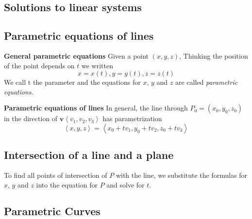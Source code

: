 \documentclass{article}
\newcommand\printvec[1]{\mathbf{#1}}
\newcommand\lrangle[1]{\left \langle #1 \right \rangle}
\begin{document}
\subsection{Solutions to linear systems}

\subsection{Parametric equations of lines}
\textbf{General parametric equations}
Given a point $(x, y, z)$, Thinking the position of the point depends on $t$ we written
$$x = x(t), y = y(t), z = z(t)$$
We call t the parameter and the equations for $x$, $y$ and $z$ are called \textit{parametric equations}.

\textbf{Parametric equations of lines}
In general, the line through $P_0 = (x_0, y_0, z_0)$ in the direction of $\printvec{v}\lrangle{v_1, v_2, v_3}$ has parametrization
$$\lrangle{x, y, z} = \lrangle{x_0+tv_1, y_0 + tv_2, z_0 + tv_3}$$

\subsection{Intersection of a line and a plane}
To find all points of intersection of $P$ with the line, we substitute the formulas for $x$, $y$ and $z$ into the equation for $P$ and solve for $t$.

\subsection{Parametric Curves}
\end{document}
